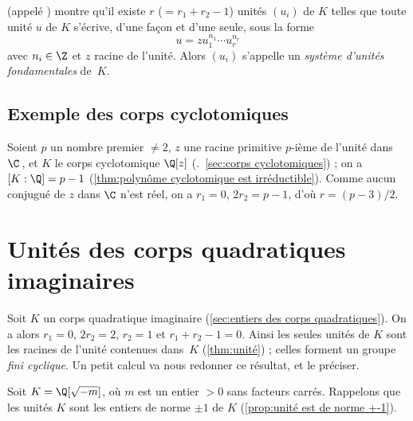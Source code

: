 \documentclass[11pt, %
  title in boldface,
  theorem in new line,
  theorem numbering = section,
  number theorems separately,
  simple name,
]{beaulivre}
\begin{document}
    \begin{remark}
         (appelé ) montre qu'il existe \( r \) (\( = r_1+r_2-1 \)) unités \( (u_i) \) de \( K \) telles que toute unité \( u \) de \( K \) s'écrive, d'une façon et d'une seule, sous la forme
        \vspace{-.2\baselineskip}%
        \begin{equation}
            u = z u_1^{n_1} \cdots u_r^{n_r}
        \end{equation}
        avec \( n_i \in \Z \) et \( z \) racine de l'unité. Alors \( (u_i) \) s'appelle un \emph{système d'unités fondamentales} de~\( K \).
    \end{remark}

    \subsection*{Exemple des corps cyclotomiques}
        Soient \( p \) un nombre premier \( \neq 2 \), \( z \) une racine primitive \( p \)‑ième de l'unité dans \( \C \)\,, et \( K \) le corps cyclotomique \( \Q[z] \) (\cf.~\cref{sec:corps cyclotomiques}) ; on a \( [K:\Q] = p-1 \) (\cref{thm:polynôme cyclotomique est irréductible}). Comme aucun conjugué de \( z \) dans \( \C \) n'est réel, on a \( r_1 = 0 \), \( 2 r_2 = p-1 \), d'où \( r = (p-3)/2 \).

\section{Unités des corps quadratiques imaginaires}

    Soit \( K \) un corps quadratique imaginaire (\cref{sec:entiers des corps quadratiques}). On a alors \( r_1 = 0 \), \( 2r_2 = 2 \), \( r_2 = 1 \) et \( r_1+r_2-1 = 0 \). Ainsi les seules unités de \( K \) sont les racines de l'unité contenues dans~\( K \) (\cref{thm:unité}) ; celles forment un groupe \emph{fini cyclique}. Un petit calcul va nous redonner ce résultat, et le préciser.

    Soit \( K = \Q[\sqrt{-m}] \), où \( m \) est un entier \( > 0 \) sans facteurs carrés. Rappelons que les unités \( K \) sont les entiers de norme \( \pm 1 \) de \( K \) (\cref{prop:unité est de norme +-1}).
\end{document}
